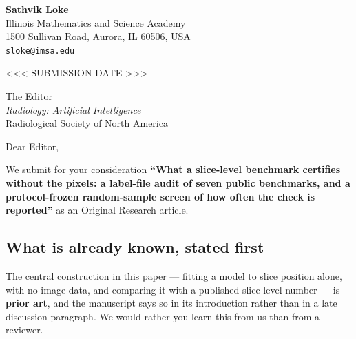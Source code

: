 \documentclass[11pt,a4paper]{article}
\begin{document}
\noindent
\textbf{Sathvik Loke}\\
Illinois Mathematics and Science Academy\\
1500 Sullivan Road, Aurora, IL 60506, USA\\
\texttt{sloke@imsa.edu}

\vspace{1.2em}

\noindent
<<< SUBMISSION DATE >>>

\vspace{1.2em}

\noindent
The Editor\\
\emph{Radiology: Artificial Intelligence}\\
Radiological Society of North America

\vspace{1.2em}

\noindent Dear Editor,

We submit for your consideration \textbf{``What a slice-level benchmark certifies
without the pixels: a label-file audit of seven public benchmarks, and a
protocol-frozen random-sample screen of how often the check is reported''} as an
Original Research article.

\subsection*{What is already known, stated first}

The central construction in this paper --- fitting a model to slice position alone,
with no image data, and comparing it with a published slice-level number --- is
\textbf{prior art}, and the manuscript says so in its introduction rather than in a
late discussion paragraph. We would rather you learn this from us than from a
reviewer.
\end{document}
